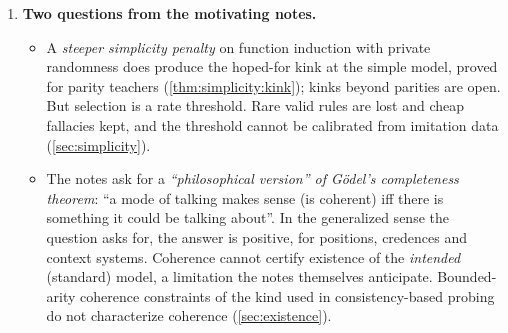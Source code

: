 \begin{enumerate}[label=\textbf{(\arabic*)}]
\begin{itemize}
  \item Designating ``idealization plus full background'' as coherent forces a structural learner to drop some classical schema in every context. If the background states the negated stipulation outright, the learner must also become atomically paraconsistent everywhere (\cref{prop:physics:misdesignation}). This is a formal version of the air-pressure worry.
  \item Exporting a conclusion from an idealization needs information of finite radius about the de-idealized family. There is no free export, by the standard adversary argument of information-based complexity \citep{traub1988information} (\cref{thm:physics:nofree}). Context choice is an attack surface (\cref{thm:physics:stipulation}).
  \item A Structured Physics Solution checker is sound against adversarial solvers relative to a judgment layer (\cref{thm:physics:relative}). That layer, consisting of the reading of the problem and the adequacy of the top model, is ineliminable (\cref{thm:physics:judgment}).
  \item ``True in the context at hand'' becomes supertruth over admissible completions (\cref{thm:physics:superval}).
  \item The approach is worked through one EuPhO problem (\cref{sec:physics:example}). Its setup was reconstructed from the motivating notes, not checked against the official text, and the checker run is a problem-specific prototype.
  \end{itemize}
\item \textbf{Two questions from the motivating notes.}
  \begin{itemize}
  \item A \emph{steeper simplicity penalty} on function induction with private randomness does produce the hoped-for kink at the simple model, proved for parity teachers (\cref{thm:simplicity:kink}); kinks beyond parities are open. But selection is a rate threshold. Rare valid rules are lost and cheap fallacies kept, and the threshold cannot be calibrated from imitation data (\cref{sec:simplicity}).
  \item The notes ask for a \emph{``philosophical version'' of G\"odel's completeness theorem}: ``a mode of talking makes sense (is coherent) iff there is something it could be talking about''. In the generalized sense the question asks for, the answer is positive, for positions, credences and context systems. Coherence cannot certify existence of the \emph{intended} (standard) model, a limitation the notes themselves anticipate. Bounded-arity coherence constraints of the kind used in consistency-based probing do not characterize coherence (\cref{sec:existence}).
  \end{itemize}
\end{enumerate}

